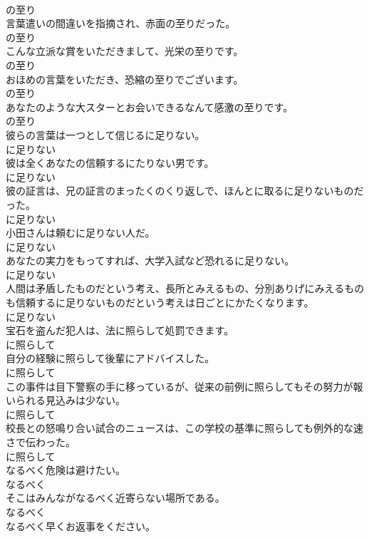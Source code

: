 \documentclass[8pt]{extreport}
\begin{document}
\begin{CJK}{UTF8}{min}
\\	の至り
\\	言葉遣いの間違いを指摘され、赤面の至りだった。	
\\	の至り
\\	こんな立派な賞をいただきまして、光栄の至りです。	
\\	の至り
\\	おほめの言葉をいただき、恐縮の至りでございます。	
\\	の至り
\\	あなたのような大スターとお会いできるなんて感激の至りです。	
\\	の至り
\\	彼らの言葉は一つとして信じるに足りない。	
\\	に足りない
\\	彼は全くあなたの信頼するにたりない男です。	
\\	に足りない
\\	彼の証言は、兄の証言のまったくのくり返しで、ほんとに取るに足りないものだった。	
\\	に足りない
\\	小田さんは頼むに足りない人だ。	
\\	に足りない
\\	あなたの実力をもってすれば、大学入試など恐れるに足りない。	
\\	に足りない
\\	人間は矛盾したものだという考え、長所とみえるもの、分別ありげにみえるものも信頼するに足りないものだという考えは日ごとにかたくなります。	
\\	に足りない
\\	宝石を盗んだ犯人は、法に照らして処罰できます。	
\\	に照らして
\\	自分の経験に照らして後輩にアドバイスした。	
\\	に照らして
\\	この事件は目下警察の手に移っているが、従来の前例に照らしてもその努力が報いられる見込みは少ない。	
\\	に照らして
\\	校長との怒鳴り合い試合のニュースは、この学校の基準に照らしても例外的な速さで伝わった。	
\\	に照らして
\\	なるべく危険は避けたい。	
\\	なるべく
\\	そこはみんながなるべく近寄らない場所である。	
\\	なるべく
\\	なるべく早くお返事をください。	

\end{CJK}
\end{document}
